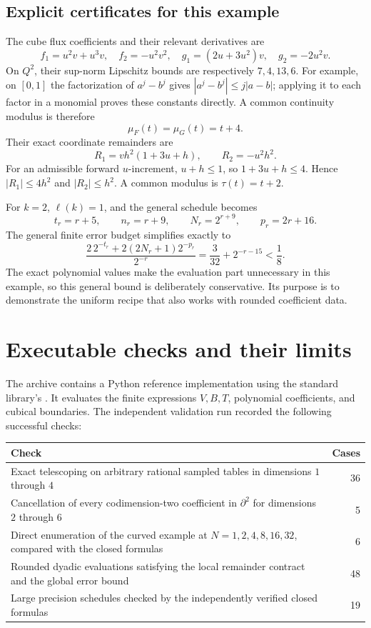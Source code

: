\subsection{Explicit certificates for this example}

The cube flux coefficients and their relevant derivatives are
\[
 f_1=u^2v+u^3v,\quad f_2=-u^2v^2,\quad
 g_1=(2u+3u^2)v,\quad g_2=-2u^2v.
\]
On $Q^2$, their sup-norm Lipschitz bounds are respectively $7,4,13,6$.
For example, on $[0,1]$ the factorization of $a^j-b^j$ gives
$|a^j-b^j|\le j|a-b|$; applying it to each factor in a monomial proves
these constants directly. A common continuity modulus is therefore
\[
 \mu_F(t)=\mu_G(t)=t+4.
\]
Their exact coordinate remainders are
\[
 R_1=vh^2(1+3u+h),\qquad R_2=-u^2h^2.
\]
For an admissible forward $u$-increment, $u+h\le1$, so
$1+3u+h\le4$. Hence $|R_1|\le4h^2$ and $|R_2|\le h^2$.
A common modulus is $\tau(t)=t+2$.

For $k=2$, $\ell(k)=1$, and the general schedule becomes
\[
 t_r=r+5,\qquad n_r=r+9,\qquad N_r=2^{r+9},\qquad p_r=2r+16.
\]
The general finite error budget simplifies exactly to
\[
 \frac{2\,2^{-t_r}+2(2N_r+1)2^{-p_r}}{2^{-r}}
       =\frac3{32}+2^{-r-15}<\frac18.
\]
The exact polynomial values make the evaluation part unnecessary in this
example, so this general bound is deliberately conservative. Its purpose
is to demonstrate the uniform recipe that also works with rounded
coefficient data.

\FloatBarrier
\section{Executable checks and their limits}\label{sec:checks}

The archive contains a Python reference implementation using the standard
library's . It evaluates the finite expressions
$V,B,T$, polynomial coefficients, and cubical boundaries. The independent
validation run recorded the following successful checks:

\begin{center}
\begin{tabular}{p{}r}
\toprule
Check & Cases\\
\midrule
Exact telescoping on arbitrary rational sampled tables in dimensions
$1$ through $4$ &36\\
Cancellation of every codimension-two coefficient in $\partial^2$
for dimensions $2$ through $6$ &5\\
Direct enumeration of the curved example at $N=1,2,4,8,16,32$,
compared with the closed formulas &6\\
Rounded dyadic evaluations satisfying the local remainder contract
and the global error bound &48\\
Large precision schedules checked by the independently verified
closed formulas &19\\
\bottomrule
\end{tabular}
\end{center}

